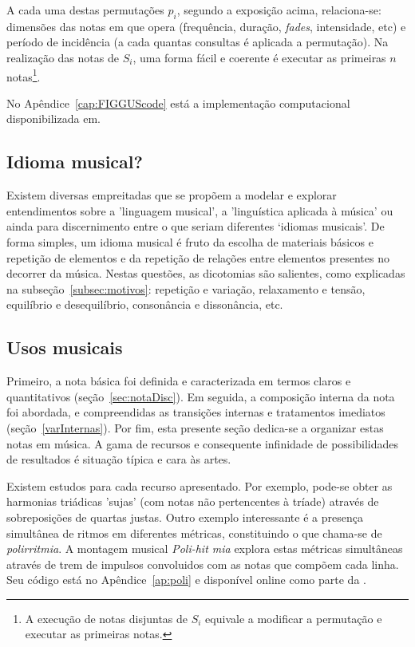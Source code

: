 A cada uma destas permutações
$p_i$, segundo a exposição acima, relaciona-se: dimensões das notas em que opera (frequência, duração, \emph{fades}, intensidade, etc) e período de incidência (a cada quantas consultas é aplicada a permutação). Na realização das notas de $S_i$, uma forma fácil e coerente é executar as primeiras $n$ notas\footnote{A execução de notas disjuntas de $S_i$ equivale a modificar a permutação e executar as primeiras notas.}.

No Apêndice~\ref{cap:FIGGUScode} está a implementação computacional disponibilizada em.\cite{MASSA,figgusOriginal,figgusEspacializacao}

\subsection{Idioma musical?}

Existem diversas empreitadas que se propõem a modelar e explorar entendimentos
sobre a 'linguagem musical', a 'linguística aplicada à música' ou ainda
para discernimento entre 
o que seriam diferentes
`idiomas musicais'.\cite{Lerdahl, Harmonia, Salzer,Alfaix}
De forma simples, um idioma musical é fruto da escolha de materiais básicos e
repetição de elementos e da repetição de relações entre elementos presentes no decorrer da música. Nestas questões, as dicotomias são salientes,
como explicadas na subseção~\ref{subsec:motivos}: repetição e variação, relaxamento e tensão, equilíbrio e desequilíbrio, consonância e dissonância, etc. 

\subsection{Usos musicais}\label{subsec:usosmusicais3}

Primeiro, a nota básica foi definida e caracterizada em termos
claros e quantitativos (seção~\ref{sec:notaDisc}). Em seguida, a composição interna da nota foi abordada, e compreendidas as transições internas e tratamentos imediatos (seção~\ref{varInternas}). Por fim, esta presente seção dedica-se a organizar estas notas em música.
A gama de recursos e consequente infinidade de possibilidades de resultados
é situação típica e cara às artes.\cite{Harmonia,Webern}

Existem estudos para cada recurso apresentado. Por exemplo, pode-se obter as harmonias triádicas 'sujas' (com notas não pertencentes à tríade) através de sobreposições de quartas justas. Outro exemplo interessante é a presença simultânea de ritmos em diferentes métricas, constituindo o que chama-se de \emph{polirritmia}. A montagem musical \emph{Poli-hit mia} explora estas métricas simultâneas através de trem de impulsos convoluidos com as notas que compõem cada linha. Seu código está no Apêndice~\ref{ap:poli} e disponível online como parte da \massa.

